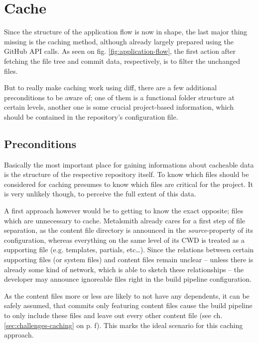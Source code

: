 \section{Cache}
\label{sec:implementation-cache}

Since the structure of the application flow is now in shape, the last major thing missing is the caching method, although already largely prepared using the GitHub API calls. As seen on fig. \ref{fig:application-flow}, the first action after fetching the file tree and commit data, respectively, is to filter the unchanged files.

But to really make caching work using diff, there are a few additional preconditions to be aware of; one of them is a functional folder structure at certain levels, another one is some crucial project-based information, which should be contained in the repository's configuration file.

\subsection{Preconditions}
Basically the most important place for gaining informations about cacheable data is the structure of the respective repository itself. To know which files should be considered for caching presumes to know which files are critical for the project. It is very unlikely though, to perceive the full extent of this data.

A first approach however would be to getting to know the exact opposite; files which are unnecessary to cache. Metalsmith already cares for a first step of file separation, as the content file directory is announced in the \emph{source}-property of its configuration, whereas everything on the same level of its CWD is treated as a supporting file (e.g. templates, partials, etc\ldots). Since the relations between certain supporting files (or system files) and content files remain unclear -- unless there is already some kind of network, which is able to sketch these relationships -- the developer may announce ignoreable files right in the build pipeline configuration.

As the content files more or less are likely to not have any dependents, it can be safely assumed, that commits only featuring content files cause the build pipeline to only include these files and leave out every other content file (see ch. \ref{sec:challenges-caching} on p. \pageref{sec:challenges-caching}f). This marks the ideal scenario for this caching approach.


